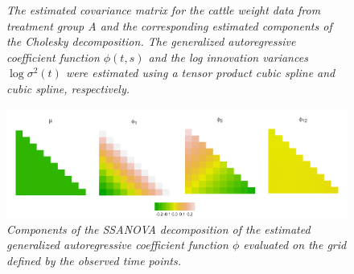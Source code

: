 \documentclass[12pt]{article}
\begin{document}
\begin{figure}[H]
\centering
 \caption{\small{\textit{The estimated covariance matrix for the cattle weight data from treatment group A and the corresponding estimated components of the Cholesky decomposition. The generalized autoregressive coefficient function $\phi\left(t,s\right)$ and the log innovation variances $\log \sigma^2\left(t\right)$ were estimated using a tensor product cubic spline and cubic spline, respectively.}}}  \label{fig:fitted-cholesky-decomposition-cattle-date}
\end{figure}
\begin{figure}[H]
\centering
      \includegraphics[width=\textwidth]{img/cattle-ssanova} 
\caption{\small{\textit{Components of the SSANOVA decomposition of the estimated generalized autoregressive coefficient function $\phi$ evaluated on the grid defined by the observed time points.}}}\label{fig:cattle-fitted-cholesky-ssanova}
\end{figure}
\end{document}
